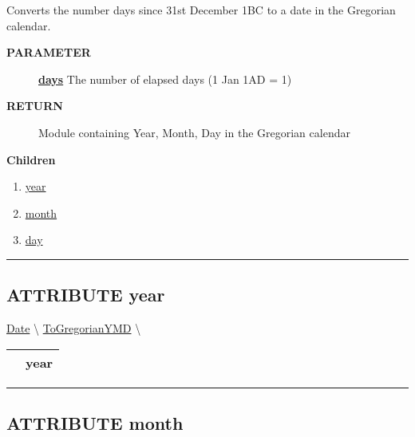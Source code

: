 \par
Converts the number days since 31st December 1BC to a date in the Gregorian calendar.

\par
\begin{description}
\item [\colorbox{tagtype}{\color{white} \textbf{\textsf{PARAMETER}}}] \textbf{\underline{days}} The number of elapsed days (1 Jan 1AD = 1)
\item [\colorbox{tagtype}{\color{white} \textbf{\textsf{RETURN}}}] \textbf{\underline{}} Module containing Year, Month, Day in the Gregorian calendar
\end{description}

\textbf{Children}
\begin{enumerate}
\item \hyperlink{ecldoc:date.togregorianymd.result.year}{year}
\item \hyperlink{ecldoc:date.togregorianymd.result.month}{month}
\item \hyperlink{ecldoc:date.togregorianymd.result.day}{day}
\end{enumerate}

\rule{\linewidth}{0.5pt}

\subsection*{\textsf{\colorbox{headtoc}{\color{white} ATTRIBUTE}
year}}

\hypertarget{ecldoc:date.togregorianymd.result.year}{}
\hspace{0pt} \hyperlink{ecldoc:Date}{Date} \textbackslash 
\hspace{0pt} \hyperlink{ecldoc:date.togregorianymd}{ToGregorianYMD} \textbackslash 

{\renewcommand{\arraystretch}{1.5}
\begin{tabularx}{\textwidth}{|>{\raggedright\arraybackslash}l|X|}
\hline
\hspace{0pt}\mytexttt{\color{red} } & \textbf{year} \\
\hline
\end{tabularx}
}

\par


\rule{\linewidth}{0.5pt}
\subsection*{\textsf{\colorbox{headtoc}{\color{white} ATTRIBUTE}
month}}

